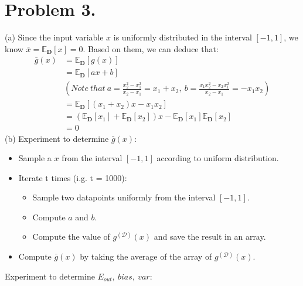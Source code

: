 \documentclass{article}
\begin{document}
    \section*{Problem 3.}
    (a) Since the input variable $x$ is uniformly distributed in the interval $[-1, 1]$, we know 
    $\bar{x} = \mathbb{E}_{\mathbf{D}}[x] = 0$. Based on them, we can deduce that:
    \begin{align*}
        \bar{g}(x) & = \mathbb{E}_{\mathbf{D}}[g(x)]\\
        & = \mathbb{E}_{\mathbf{D}}[ax + b]\\
        & (Note \ that \ a = \frac{x_2^2 - x_1^2}{x_2 - x_1} = x_1 + x_2, 
        \ b = \frac{x_1x_2^2 - x_2x_1^2}{x_2 - x_1} = -x_1x_2)\\
        & = \mathbb{E}_{\mathbf{D}}[(x_1 + x_2)x - x_1x_2]\\
        & = (\mathbb{E}_{\mathbf{D}}[x_1] + \mathbb{E}_{\mathbf{D}}[x_2])x - 
        \mathbb{E}_{\mathbf{D}}[x_1]\mathbb{E}_{\mathbf{D}}[x_2]\\
        & = 0
    \end{align*}
    (b) Experiment to determine $\bar{g}(x)$:
    \begin{itemize}
        \item Sample a $x$ from the interval $[-1, 1]$ according to uniform distribution.
        \item Iterate t times (i.g. t = 1000):
        \begin{itemize}
            \item Sample two datapoints uniformly from the interval $[-1, 1]$.
            \item Compute $a$ and $b$.
            \item Compute the value of $g^{(\mathcal{D})}(x)$ and save the result in an array.
        \end{itemize}
        \item Compute $\bar{g}(x)$ by taking the average of the array of $g^{(\mathcal{D})}(x)$.
    \end{itemize}
    Experiment to determine $E_{out}, \ bias, \ var$:
\end{document}
